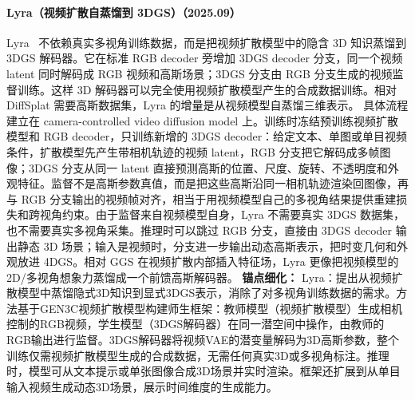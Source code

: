 \paragraph{Lyra（视频扩散自蒸馏到 3DGS）（2025.09）}
Lyra~\cite{2509_19296} 不依赖真实多视角训练数据，而是把视频扩散模型中的隐含 3D 知识蒸馏到 3DGS 解码器。它在标准 RGB decoder 旁增加 3DGS decoder 分支，同一个视频 latent 同时解码成 RGB 视频和高斯场景；3DGS 分支由 RGB 分支生成的视频监督训练。这样 3D 解码器可以完全使用视频扩散模型产生的合成数据训练。相对 DiffSplat 需要高斯数据集，Lyra 的增量是从视频模型自蒸馏三维表示。
具体流程建立在 camera-controlled video diffusion model 上。训练时冻结预训练视频扩散模型和 RGB decoder，只训练新增的 3DGS decoder：给定文本、单图或单目视频条件，扩散模型先产生带相机轨迹的视频 latent，RGB 分支把它解码成多帧图像；3DGS 分支从同一 latent 直接预测高斯的位置、尺度、旋转、不透明度和外观特征。监督不是高斯参数真值，而是把这些高斯沿同一相机轨迹渲染回图像，再与 RGB 分支输出的视频帧对齐，相当于用视频模型自己的多视角结果提供重建损失和跨视角约束。由于监督来自视频模型自身，Lyra 不需要真实 3DGS 数据集，也不需要真实多视角采集。推理时可以跳过 RGB 分支，直接由 3DGS decoder 输出静态 3D 场景；输入是视频时，分支进一步输出动态高斯表示，把时变几何和外观放进 4DGS。相对 GGS 在视频扩散内部插入特征场，Lyra 更像把视频模型的 2D/多视角想象力蒸馏成一个前馈高斯解码器。
\textbf{锚点细化：} Lyra：提出从视频扩散模型中蒸馏隐式3D知识到显式3DGS表示，消除了对多视角训练数据的需求。方法基于GEN3C视频扩散模型构建师生框架：教师模型（视频扩散模型）生成相机控制的RGB视频，学生模型（3DGS解码器）在同一潜空间中操作，由教师的RGB输出进行监督。3DGS解码器将视频VAE的潜变量解码为3D高斯参数，整个训练仅需视频扩散模型生成的合成数据，无需任何真实3D或多视角标注。推理时，模型可从文本提示或单张图像合成3D场景并实时渲染。框架还扩展到从单目输入视频生成动态3D场景，展示时间维度的生成能力。
